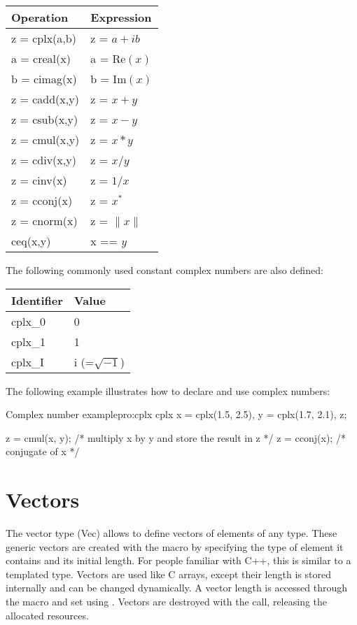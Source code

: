 \begin{center}
\begin{tabular}{|p{5cm}p{5cm}|}
\hline
Operation & Expression \\
\hline
z = cplx(a,b) & z = $a + i b$ \\
a = creal(x) & a = $\textrm{Re}(x)$ \\
b = cimag(x) & b = $\textrm{Im}(x)$ \\
z = cadd(x,y) & z = $x + y$ \\
z = csub(x,y) & z = $x - y$ \\
z = cmul(x,y) & z = $x * y$ \\
z = cdiv(x,y) & z = $x / y$ \\
z = cinv(x) & z = $1 / x$ \\
z = cconj(x) & z = $x^*$ \\
z = cnorm(x) & z = $\|x\|$ \\
ceq(x,y) & x == $y$ \\
\hline
\end{tabular}
\end{center}

The following commonly used constant complex numbers are also defined:

\begin{center}
\begin{tabular}{|p{5cm}p{5cm}|}
\hline
       Identifier &    Value \\
\hline
          cplx\_0 &       0 \\
          cplx\_1 &       1 \\
          cplx\_I &       i (=$\sqrt{-1}$) \\
\hline
\end{tabular}
\end{center}

    The following example illustrates how to declare and use complex numbers:

\begin{program}{Complex number example}{pro:cplx}
  cplx x = cplx(1.5, 2.5), y = cplx(1.7, 2.1), z;

  z = cmul(x, y); /* multiply x by y and store the result in z */
  z = cconj(x);   /* conjugate of x */
\end{program}

\section{Vectors}
\label{sec:vectors}

     The vector type (Vec) allows to define vectors of elements of any
     type.  These generic vectors are created with the  macro
     by specifying the type of element it contains and its initial
     length. For people familiar with C++, this is similar to a
     templated type.  Vectors are used like C arrays, except their
     length is stored internally and can be changed dynamically. A
     vector length is accessed through the  macro and set
     using . Vectors are destroyed with the
      call, releasing the allocated resources.

